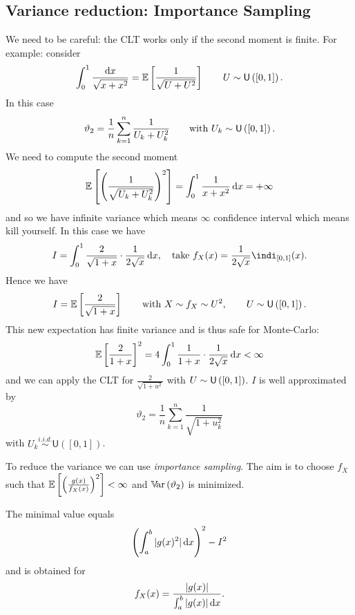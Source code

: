 \documentclass[12pt]{report}
\begin{document}
\subsection{Variance reduction: Importance Sampling}
We need to be careful: the CLT works only if the second moment is finite.
For example: consider
\begin{equation*}
	\int_{0}^{1}\frac{\mathop{}\!\mathrm{d} x}{\sqrt{x+x^{2}}}=\mathbb{E}\left[\frac{1}{\sqrt{U+U^{2}}}\right]\qquad U\sim\mathsf{U}\left([0,1]\right).
\end{equation*}
In this case 
\begin{equation*}
	\vartheta_2=\frac{1}{n}\sum_{k=1}^{n}\frac{1}{U_{k}+U^{2}_{k}}\qquad\text{with }U_{k}\sim\mathsf{U}\left([0,1]\right).
\end{equation*}
We need to compute the second moment
\begin{equation*}
	\mathbb{E}\left[\left(\frac{1}{\sqrt{U_{k}+U_{k}^{2}}}\right)^{2}\right]=\int_{0}^{1}\frac{1}{x+x^{2}}\mathop{}\!\mathrm{d} x=+\infty
\end{equation*}
and so we have infinite variance which means $\infty$ confidence interval which means kill yourself.
In this case we have 
\begin{equation*}
	I=\int_{0}^{1}\frac{2}{\sqrt{1+x}}\cdot\frac{1}{2\sqrt{x}}\dx,\quad\text{take } f_X(x)=\frac{1}{2\sqrt{x}}\indi_{[0,1]}(x).
\end{equation*}
Hence we have 
\begin{equation*}
	I=\mathbb{E}\left[\frac{2}{\sqrt{1+x}}\right]\qquad\text{with }X\sim f_X\sim U^{2},\qquad U\sim\mathsf{U}\left([0,1]\right).
\end{equation*}
This new expectation has finite variance and is thus safe for Monte-Carlo:
\begin{equation*}
	\mathbb{E}\left[\frac{2}{1+x}\right]^{2}=4\int_{0}^{1}\frac{1}{1+x}\cdot\frac{1}{2\sqrt{x}}\mathop{}\!\mathrm{d} x<\infty
\end{equation*}
and we can apply the CLT for $\frac{2}{\sqrt{1+u^{2}}}$ with $U\sim\mathsf{U}\left([0,1]\right)$. $I$ is well approximated by
\begin{equation*}
	\vartheta_2=\frac{1}{n}\sum_{k=1}^{n}\frac{1}{\sqrt{1+u_{k}^{2}}}
\end{equation*}
with $U_k\overset{i.i.d.}{\sim}\mathsf{U}([0,1])$.\par
To reduce the variance we can use \emph{importance sampling}. The aim is to choose $f_X$ such that $\mathbb{E}\left[\left(\frac{g(x)}{f_X(x)}\right)^{2}\right]<\infty$ and $\mathbb{V}\!\mathrm{ar}\,(\vartheta_2)$ is minimized.
\begin{proposition}
	The minimal value equals
	\begin{equation*}
		\left(\int_{a}^{b}|g(x)^{2}|\mathop{}\!\mathrm{d} x\right)^{2}-I^{2}
	\end{equation*}
	and is obtained for
	\begin{equation*}
		f_X(x)=\frac{|g(x)|}{\int_{a}^{b}|g(x)|\mathop{}\!\mathrm{d} x}.
	\end{equation*}
\end{proposition}
\end{document}

